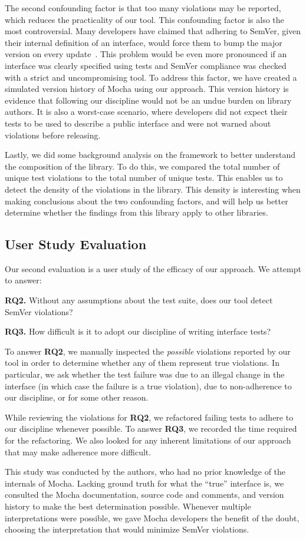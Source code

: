 The second confounding factor is that too many violations may be
reported, which reduces the practicality of our tool. This
confounding factor is also the most controversial. Many developers
have claimed that adhering to SemVer, given their internal definition
of an interface, would force them to bump the major version on every
update~\cite{backbone-2888,exoplayer-1382,crawford-not-semver}. This
problem would be even more pronounced if an interface was clearly
specified using tests and SemVer compliance was checked with a strict
and uncompromising tool. To address this factor, we have created a
simulated version history of Mocha using our approach. This version
history is evidence that following our discipline would not be an undue
burden on library authors. It is also a worst-case scenario, where
developers did not expect their tests to be used to describe a public
interface and were not warned about violations before releasing.

 \-Lastly, we did some background analysis on the framework to better
understand the composition of the library. To do this, we compared the
total number of unique test violations to the total number of unique
tests. This enables us to detect the density of the violations in the
library. This density is interesting when making conclusions about
the two confounding factors, and will help us better determine
whether the findings from this library apply to other libraries.

\subsection{User Study Evaluation}
Our second evaluation is a user study of the efficacy of our
approach. We attempt to answer: 

{\bf RQ2.} Without any assumptions about the test suite, does our tool
detect SemVer violations?

{\bf RQ3.} How difficult is it to adopt our discipline of writing interface
tests?

To answer {\bf RQ2}, we manually inspected the {\em possible} 
violations reported by our tool in order to determine whether any of
them represent true violations. In particular, we ask whether the test
failure was due to an illegal change in the interface (in which case
the failure is a true violation), due to non-adherence to our
discipline, or for some other reason.

While reviewing the violations for {\bf RQ2}, we refactored failing
tests to adhere to our discipline whenever possible. To answer {\bf
  RQ3}, we recorded the time required for the refactoring. We also
looked for any inherent limitations of our approach that may make
adherence more difficult.

This study was conducted by the authors, who had no prior knowledge of
the internals of Mocha. Lacking ground truth for what the ``true''
interface is, we consulted the Mocha documentation, source code and
comments, and version history to make the best determination
possible. Whenever multiple interpretations were possible, we gave
Mocha developers the benefit of the doubt, choosing the interpretation
that would minimize SemVer violations.

